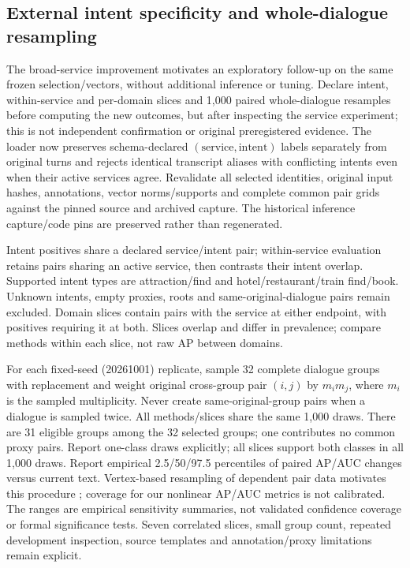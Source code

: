 \documentclass[11pt]{article}
\begin{document}
\subsection{External intent specificity and whole-dialogue resampling}
The broad-service improvement motivates an exploratory follow-up on the same
frozen selection/vectors, without additional inference or tuning. Declare intent,
within-service and per-domain slices and 1,000 paired whole-dialogue resamples
before computing the new outcomes, but after inspecting the service experiment;
this is not independent confirmation or original preregistered evidence.
The loader now preserves schema-declared $(\mathrm{service},\mathrm{intent})$
labels separately from original turns and rejects identical transcript aliases
with conflicting intents even when their active services agree. Revalidate all
selected identities, original input hashes, annotations, vector norms/supports
and complete common pair grids against the pinned source and archived capture.
The historical inference capture/code pins are preserved rather than regenerated.

Intent positives share a declared service/intent pair; within-service evaluation
retains pairs sharing an active service, then contrasts their intent overlap.
Supported intent types are attraction/find and hotel/restaurant/train find/book.
Unknown intents, empty proxies, roots and same-original-dialogue pairs remain
excluded. Domain slices contain pairs with the service at either endpoint, with
positives requiring it at both. Slices overlap and differ in prevalence; compare
methods within each slice, not raw AP between domains.

For each fixed-seed (20261001) replicate, sample 32 complete dialogue groups with
replacement and weight original cross-group pair $(i,j)$ by $m_i m_j$, where
$m_i$ is the sampled multiplicity. Never create same-original-group pairs when
a dialogue is sampled twice. All methods/slices share the same 1,000 draws.
There are 31 eligible groups among the 32 selected groups; one contributes no
common proxy pairs. Report one-class draws explicitly; all slices support both
classes in all 1,000 draws. Report empirical 2.5/50/97.5 percentiles of paired
AP/AUC changes versus current text. Vertex-based resampling of dependent pair
data motivates this procedure \cite{snowboot}; coverage for our nonlinear AP/AUC
metrics is not calibrated. The ranges are empirical sensitivity summaries, not
validated confidence coverage or formal significance tests. Seven correlated
slices, small group count, repeated development inspection, source templates and
annotation/proxy limitations remain explicit.
\end{document}
